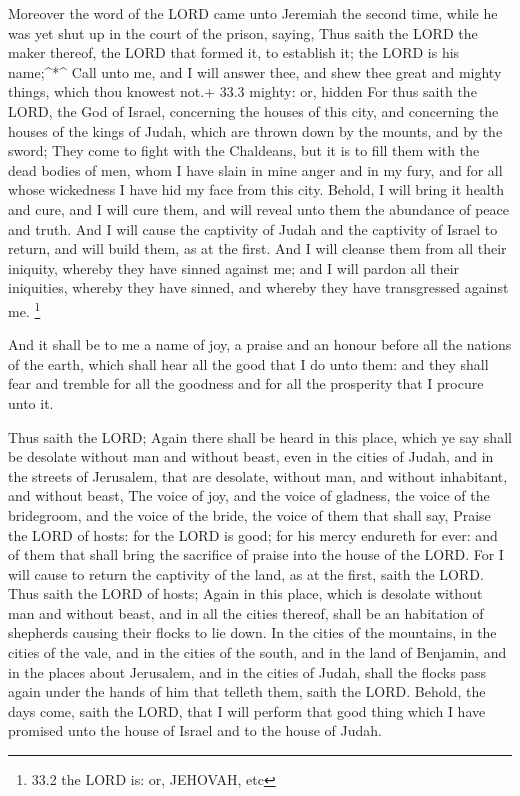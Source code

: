  Moreover the word of the LORD came unto Jeremiah the second
time, while he was yet shut up in the court of the prison, saying,
 Thus saith the LORD the maker thereof, the LORD that formed
it, to establish it; the LORD is his name;\^{}*\^{}  Call
unto me, and I will answer thee, and shew thee great and mighty things,
which thou knowest not.+ 33.3 mighty: or, hidden  For thus
saith the LORD, the God of Israel, concerning the houses of this city,
and concerning the houses of the kings of Judah, which are thrown down
by the mounts, and by the sword;  They come to fight with
the Chaldeans, but it is to fill them with the dead bodies of men, whom
I have slain in mine anger and in my fury, and for all whose wickedness
I have hid my face from this city.  Behold, I will bring it
health and cure, and I will cure them, and will reveal unto them the
abundance of peace and truth.  And I will cause the
captivity of Judah and the captivity of Israel to return, and will build
them, as at the first.  And I will cleanse them from all
their iniquity, whereby they have sinned against me; and I will pardon
all their iniquities, whereby they have sinned, and whereby they have
transgressed against me. \footnote{33.2 the LORD is: or, JEHOVAH, etc}

 And it shall be to me a name of joy, a praise and an honour
before all the nations of the earth, which shall hear all the good that
I do unto them: and they shall fear and tremble for all the goodness and
for all the prosperity that I procure unto it.

 Thus saith the LORD; Again there shall be heard in this
place, which ye say shall be desolate without man and without beast,
even in the cities of Judah, and in the streets of Jerusalem, that are
desolate, without man, and without inhabitant, and without beast,
 The voice of joy, and the voice of gladness, the voice of
the bridegroom, and the voice of the bride, the voice of them that shall
say, Praise the LORD of hosts: for the LORD is good; for his mercy
endureth for ever: and of them that shall bring the sacrifice of praise
into the house of the LORD. For I will cause to return the captivity of
the land, as at the first, saith the LORD.  Thus saith the
LORD of hosts; Again in this place, which is desolate without man and
without beast, and in all the cities thereof, shall be an habitation of
shepherds causing their flocks to lie down.  In the cities
of the mountains, in the cities of the vale, and in the cities of the
south, and in the land of Benjamin, and in the places about Jerusalem,
and in the cities of Judah, shall the flocks pass again under the hands
of him that telleth them, saith the LORD.  Behold, the days
come, saith the LORD, that I will perform that good thing which I have
promised unto the house of Israel and to the house of Judah.

